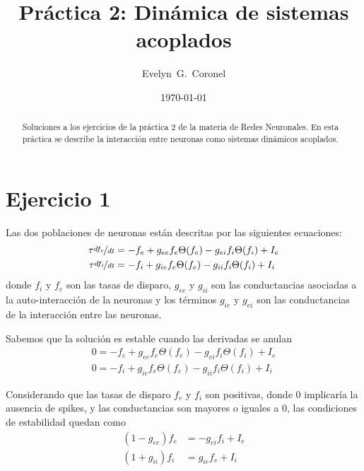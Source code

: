 



\title{Práctica 2: Dinámica de sistemas acoplados }
\author{Evelyn~G.~Coronel}


\date[]{\lowercase{\today}} %

\begin{abstract}
Soluciones a los ejercicios de la práctica 2 de la materia de Redes Neuronales. En esta práctica se describe  la interacción entre neuronas como sistemas dinámicos acoplados.
\end{abstract} 
\maketitle

\section*{Ejercicio 1}

Las dos poblaciones de neuronas están descritas por las siguientes ecuaciones:
\begin{align}
    \tau \nicefrac{df_e}{dt} &= -f_e + g_{ee} f_e\Theta(f_e) - g_{ei}f_i\Theta(f_i) + I_e\\
    \tau \nicefrac{df_i}{dt} &= -f_i + g_{ie} f_e\Theta(f_e) - g_{ii}f_i\Theta(f_i) + I_i
\end{align}
donde $f_i$ y $f_e$ son las tasas de disparo, $g_{ee}$ y $g_{ii}$ son las conductancias asociadas a la auto-interacción de la neuronas y los términos $g_{ie}$ y $g_{ei}$ son las conductancias de la interacción entre las neuronas.

Sabemos que la solución es estable cuando las derivadas se anulan
\begin{align}
    0= -f_e + g_{ee} f_e\Theta(f_e) - g_{ei}f_i\Theta(f_i) + I_e\\
    0= -f_i + g_{ie} f_e\Theta(f_e) - g_{ii}f_i\Theta(f_i) + I_i
\end{align}

Considerando que las tasas de disparo $f_e$ y $f_i$ son positivas, donde $0$ implicaría la ausencia de spikes, y las conductancias  son mayores o iguales a 0,  las condiciones de estabilidad quedan como
\begin{align}
     (1 -g_{ee}) f_e &= -g_{ei}f_i + I_e \label{fe}\\
    (1 + g_{ii}) f_i &=  g_{ie} f_e  + I_i
\end{align}

